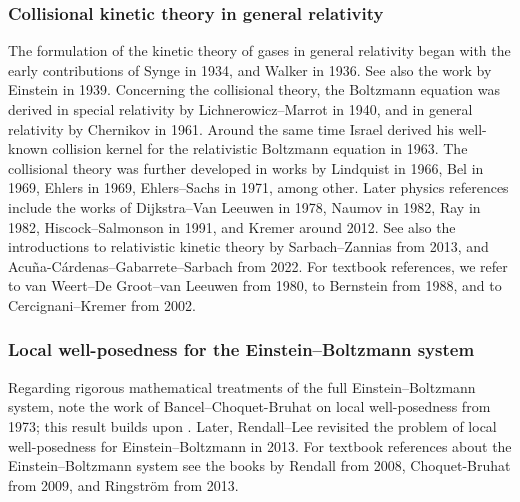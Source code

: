 \documentclass[reqno]{amsart}
\theoremstyle{definition}
\numberwithin{equation}{section}
\numberwithin{theorem}{section}
\begin{document}
\subsubsection{Collisional kinetic theory in general relativity}
The formulation of the kinetic theory of gases in general relativity began with the early contributions of Synge \cite{Synge1934} in 1934, and Walker \cite{walker1936boltzmann} in 1936. See also the work by Einstein \cite{Einstein1938} in 1939. Concerning the collisional theory, the Boltzmann equation was derived in special relativity by Lichnerowicz--Marrot \cite{MR0004796} in 1940, and in general relativity by Chernikov \cite{Chernikov1961,zbMATH03209008} in 1961. Around the same time Israel derived his well-known collision kernel for the relativistic Boltzmann equation \cite{MR165921} in 1963. The collisional theory was further developed in works by Lindquist \cite{LINDQUIST1966487} in 1966, Bel \cite{Bel1969} in 1969, Ehlers \cite{Ehlers1971GeneralRA} in 1969, Ehlers--Sachs \cite{EhlersSachs1971} in 1971, among other. Later physics references include the works of Dijkstra--Van Leeuwen  \cite{MR508285,MR471665} in 1978, Naumov \cite{Naumov1982} in 1982, Ray \cite{Ray1982} in 1982, Hiscock--Salmonson \cite{hiscock1991dissipative} in 1991, and Kremer \cite{Kremer2012,Kremer2013} around 2012. See also the introductions to relativistic kinetic theory by Sarbach--Zannias \cite{Sarbach2013} from 2013, and Acu\~na-C\'ardenas--Gabarrete--Sarbach \cite{AcuaCrdenas2022} from 2022. For textbook references, we refer to van Weert--De Groot--van Leeuwen \cite{MR635279} from 1980, to Bernstein \cite{Bernstein1988} from 1988, and to Cercignani--Kremer \cite{CercignaniKremer2002} from 2002.

\subsubsection{Local well-posedness for the Einstein--Boltzmann system}


Regarding rigorous mathematical treatments of the full Einstein--Boltzmann system, note the work of Bancel--Choquet-Bruhat \cite{MR356790} on local well-posedness from 1973; this result builds upon \cite{MR0337248,MR0308609}.  Later, Rendall--Lee \cite{MR3043490} revisited the problem of local well-posedness for Einstein--Boltzmann in 2013. For textbook references about the Einstein--Boltzmann system see the books by Rendall \cite{book:1276737} from 2008, Choquet-Bruhat \cite{ChoquetBruhat2009} from 2009, and Ringstr\"om \cite{MR3186493} from 2013. 
\end{document}
